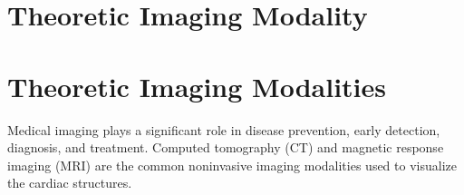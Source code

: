 %


%


%

\section{Theoretic Imaging Modality}  \label{sec:Modality} 
\section{Theoretic Imaging Modalities}
Medical imaging plays a significant role in disease prevention, early detection, diagnosis, and treatment. Computed tomography (CT) and magnetic response imaging (MRI) are the common noninvasive imaging modalities used to visualize the cardiac structures. 

